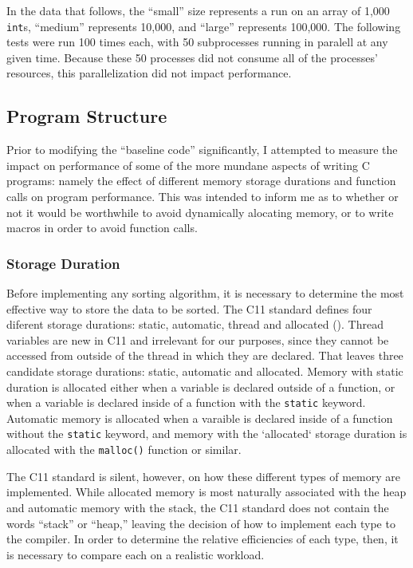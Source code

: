 \documentclass{article}
\begin{document}
In the data that follows, the ``small'' size represents a run on an array of 1,000
\texttt{int}s, ``medium'' represents 10,000, and ``large'' represents
100,000. The following tests were run 100 times each, with 50
subprocesses running in paralell at any given time. Because these 50
processes did not consume all of the processes' resources, this parallelization did not
impact performance.

\subsection{Program Structure}
Prior to modifying the ``baseline code'' significantly, I attempted to
measure the impact on performance of some of the more mundane aspects
of writing C programs: namely the effect of different memory storage
durations and function calls on program performance. This was intended
to inform me as to whether or not it would be worthwhile to avoid
dynamically alocating memory, or to write macros in order to avoid
function calls.

\subsubsection{Storage Duration}

Before implementing any sorting algorithm, it is necessary to
determine the most effective way to store the data to be
sorted. The C11 standard defines four diferent storage durations:
static, automatic, thread and allocated (\cite[\S 6.2.4]{CStd}).
Thread variables are new in C11 and irrelevant for our purposes, since they cannot be
accessed from outside of the thread in which they are declared. That
leaves three candidate storage durations: static, automatic and
allocated. Memory with static duration is allocated either when a
variable is declared outside of a
function, or when a variable is declared inside of a function with the \texttt{static}
keyword. Automatic memory is allocated when a varaible is declared
inside of a function without the \texttt{static} keyword, and memory
with the `allocated` storage duration is allocated with the
\texttt{malloc()} function or similar. \smallskip

The C11 standard is silent, however, on how these different types of
memory are implemented. While allocated memory is most naturally
associated with the heap and automatic memory with the stack, the C11
standard does not contain the words ``stack'' or ``heap,'' leaving the
decision of how to implement each type to the compiler. In order to
determine the relative efficiencies of each type, then, it is
necessary to compare each on a realistic workload.
\end{document}
